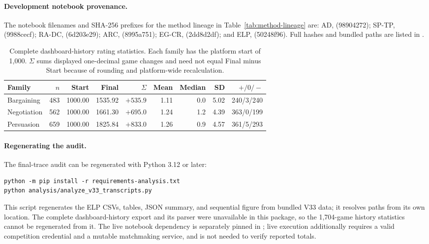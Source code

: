 \paragraph{Development notebook provenance.}
The notebook filenames and SHA-256 prefixes for the method lineage in
Table~\ref{tab:method-lineage} are: AD,
(98904272); SP-TP,
(9988cecf); RA-DC,
(6d203e29); ARC,
(8995a751); EG-CR,
(2dd8d2df); and ELP,
(50248f96). Full hashes and bundled paths are listed in
.

\begin{table}[t]
\centering
\small
\caption{Complete dashboard-history rating statistics. Each family has the
platform start of 1,000. $\Sigma$ sums displayed one-decimal game changes and
need not equal Final minus Start because of rounding and platform-wide
recalculation.}
\label{tab:complete-history}
\begin{tabular}{@{}lrrrrrrrr@{}}
\toprule
Family & $n$ & Start & Final & $\Sigma$ & Mean & Median & SD & $+/0/-$ \\
\midrule
Bargaining & 483 & 1000.00 & 1535.92 & $+535.9$ & 1.11 & 0.0 & 5.02 & 240/3/240 \\
Negotiation & 562 & 1000.00 & 1661.30 & $+695.0$ & 1.24 & 1.2 & 4.39 & 363/0/199 \\
Persuasion & 659 & 1000.00 & 1825.84 & $+833.0$ & 1.26 & 0.9 & 4.57 & 361/5/293 \\
\bottomrule
\end{tabular}
\end{table}

\paragraph{Regenerating the audit.}
The final-trace audit can be regenerated with Python 3.12 or later:
\begin{verbatim}
python -m pip install -r requirements-analysis.txt
python analysis/analyze_v33_transcripts.py
\end{verbatim}
This script regenerates the ELP CSVs, tables, JSON summary, and sequential
figure from bundled V33 data; it resolves paths from its own location. The
complete dashboard-history export and its parser were unavailable in this
package, so the 1,704-game history statistics cannot be regenerated from it.
The live
notebook dependency is separately pinned in ; live
execution additionally requires a valid competition credential and a mutable
matchmaking service, and is not needed to verify reported totals.

